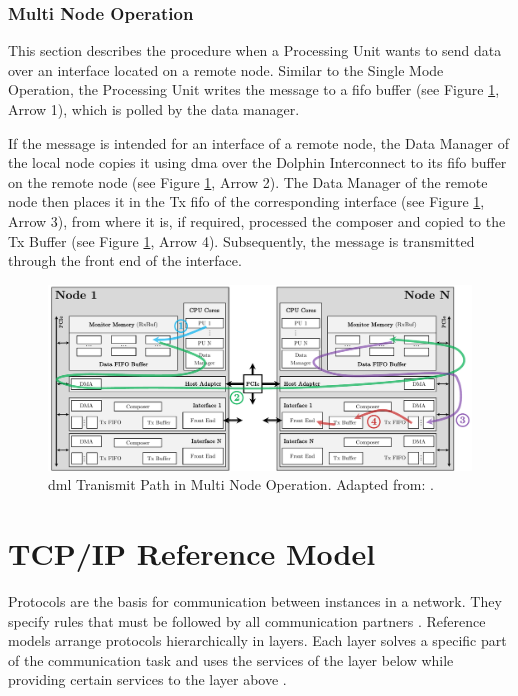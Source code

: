 \subsubsection{Multi Node Operation}
This section describes the procedure when a Processing Unit wants to send data over an interface located on a remote node. Similar to the Single Mode Operation, the Processing Unit writes the message to a \ac{fifo} buffer (see Figure \ref{fig:DmlTransMultiNode}, Arrow 1), which is polled by the data manager.

If the message is intended for an interface of a remote node, the Data Manager of the local node copies it using \ac{dma} over the Dolphin Interconnect to its \ac{fifo} buffer on the remote node (see Figure \ref{fig:DmlTransMultiNode}, Arrow 2). The Data Manager of the remote node then places it in the Tx \ac{fifo} of the corresponding interface (see Figure \ref{fig:DmlTransMultiNode}, Arrow 3), from where it is, if required, processed the composer and copied to the Tx Buffer (see Figure \ref{fig:DmlTransMultiNode}, Arrow 4). Subsequently, the message is transmitted through the front end of the interface. \\

\begin{figure}[!h]
    \centering
    \includegraphics[width=\linewidth]{figures/dml/dml03b.pdf}
    \caption[DML Transmit Path in Multi Node Operation]{\ac{dml} Tranismit Path in Multi Node Operation. Adapted from: \cite{dml01}.}
    \label{fig:DmlTransMultiNode}
\end{figure}

\clearpage


\section{TCP/IP Reference Model} \label{chap:RefModel}

Protocols are the basis for communication between instances in a network. They specify rules that must be followed by all communication partners \cite{Tanenbaum2010}. Reference models arrange protocols hierarchically in layers. Each layer solves a specific part of the communication task and uses the services of the layer below while providing certain services to the layer above \cite{Weigel2021}.

